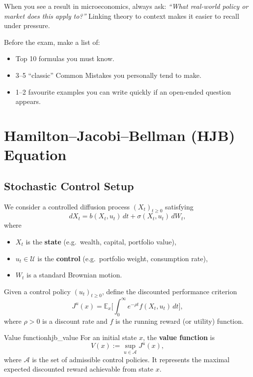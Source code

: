 \documentclass[12pt]{article}
\begin{document}
\begin{policynote}
When you see a result in microeconomics, always ask: \emph{``What real-world policy or market does this apply to?''} Linking theory to context makes it easier to recall under pressure.
\end{policynote}

\begin{examtip}
Before the exam, make a list of:
\begin{itemize}
    \item Top 10 formulas you must know.
    \item 3--5 ``classic'' Common Mistakes you personally tend to make.
    \item 1--2 favourite examples you can write quickly if an open-ended question appears.
\end{itemize}
\end{examtip}

\section{Hamilton--Jacobi--Bellman (HJB) Equation}
\label{sec:hjb}

\subsection{Stochastic Control Setup}

We consider a controlled diffusion process $(X_t)_{t\ge 0}$ satisfying
\[
  dX_t = b(X_t,u_t)\,dt + \sigma(X_t,u_t)\,dW_t,
\]
where
\begin{itemize}
  \item $X_t$ is the \textbf{state} (e.g.\ wealth, capital, portfolio value),
  \item $u_t \in \mathcal{U}$ is the \textbf{control} (e.g.\ portfolio weight, consumption rate),
  \item $W_t$ is a standard Brownian motion.
\end{itemize}

Given a control policy $(u_t)_{t\ge 0}$, define the discounted performance criterion
\[
  J^{u}(x) = \mathbb{E}_x\Bigg[\int_0^\infty e^{-\rho t} f(X_t,u_t)\,dt\Bigg],
\]
where $\rho>0$ is a discount rate and $f$ is the running reward (or utility) function.

\begin{definition}{Value function}{hjb_value}
For an initial state $x$, the \textbf{value function} is
\[
  V(x) := \sup_{u \in \mathcal{A}} J^{u}(x),
\]
where $\mathcal{A}$ is the set of admissible control policies. It represents
the maximal expected discounted reward achievable from state $x$.
\end{definition}
\end{document}
